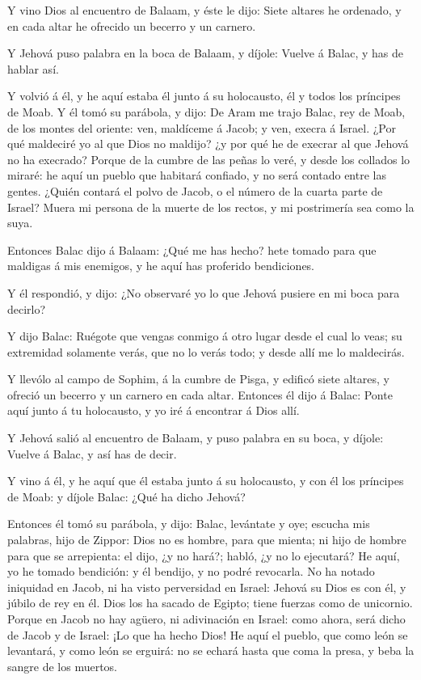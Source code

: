  Y vino Dios al encuentro de Balaam, y éste le dijo: Siete
altares he ordenado, y en cada altar he ofrecido un becerro y un
carnero.

 Y Jehová puso palabra en la boca de Balaam, y díjole:
Vuelve á Balac, y has de hablar así.

 Y volvió á él, y he aquí estaba él junto á su holocausto,
él y todos los príncipes de Moab.  Y él tomó su parábola, y
dijo: De Aram me trajo Balac, rey de Moab, de los montes del oriente:
ven, maldíceme á Jacob; y ven, execra á Israel.  ¿Por qué
maldeciré yo al que Dios no maldijo? ¿y por qué he de execrar al que
Jehová no ha execrado?  Porque de la cumbre de las peñas lo
veré, y desde los collados lo miraré: he aquí un pueblo que habitará
confiado, y no será contado entre las gentes.  ¿Quién
contará el polvo de Jacob, o el número de la cuarta parte de Israel?
Muera mi persona de la muerte de los rectos, y mi postrimería sea como
la suya.

 Entonces Balac dijo á Balaam: ¿Qué me has hecho? hete
tomado para que maldigas á mis enemigos, y he aquí has proferido
bendiciones.

 Y él respondió, y dijo: ¿No observaré yo lo que Jehová
pusiere en mi boca para decirlo?

 Y dijo Balac: Ruégote que vengas conmigo á otro lugar
desde el cual lo veas; su extremidad solamente verás, que no lo verás
todo; y desde allí me lo maldecirás.

 Y llevólo al campo de Sophim, á la cumbre de Pisga, y
edificó siete altares, y ofreció un becerro y un carnero en cada altar.
 Entonces él dijo á Balac: Ponte aquí junto á tu
holocausto, y yo iré á encontrar á Dios allí.

 Y Jehová salió al encuentro de Balaam, y puso palabra en
su boca, y díjole: Vuelve á Balac, y así has de decir.

 Y vino á él, y he aquí que él estaba junto á su
holocausto, y con él los príncipes de Moab: y díjole Balac: ¿Qué ha
dicho Jehová?

 Entonces él tomó su parábola, y dijo: Balac, levántate y
oye; escucha mis palabras, hijo de Zippor:  Dios no es
hombre, para que mienta; ni hijo de hombre para que se arrepienta: el
dijo, ¿y no hará?; habló, ¿y no lo ejecutará?  He aquí, yo
he tomado bendición: y él bendijo, y no podré revocarla. 
No ha notado iniquidad en Jacob, ni ha visto perversidad en Israel:
Jehová su Dios es con él, y júbilo de rey en él.  Dios los
ha sacado de Egipto; tiene fuerzas como de unicornio. 
Porque en Jacob no hay agüero, ni adivinación en Israel: como ahora,
será dicho de Jacob y de Israel: ¡Lo que ha hecho Dios!  He
aquí el pueblo, que como león se levantará, y como león se erguirá: no
se echará hasta que coma la presa, y beba la sangre de los muertos.


